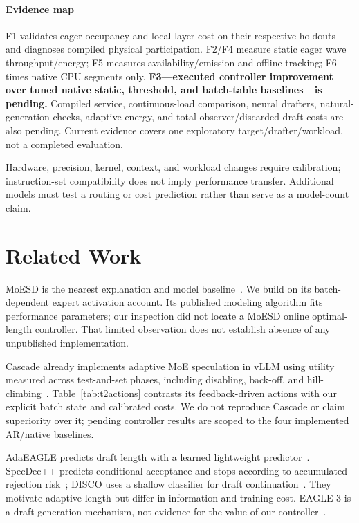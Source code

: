 \documentclass[conference,letterpaper]{IEEEtran}
\begin{document}
\paragraph{Evidence map} F1 validates eager occupancy and local layer cost on their respective holdouts and diagnoses compiled physical participation. F2/F4 measure static eager wave throughput/energy; F5 measures availability/emission and offline tracking; F6 times native CPU segments only. \textbf{F3---executed controller improvement over tuned native static, threshold, and batch-table baselines---is pending.} Compiled service, continuous-load comparison, neural drafters, natural-generation checks, adaptive energy, and total observer/discarded-draft costs are also pending. Current evidence covers one exploratory target/drafter/workload, not a completed evaluation.

Hardware, precision, kernel, context, and workload changes require calibration; instruction-set compatibility does not imply performance transfer. Additional models must test a routing or cost prediction rather than serve as a model-count claim.

\section{Related Work}

MoESD is the nearest explanation and model baseline~\cite{moesd}. We build on its batch-dependent expert activation account. Its published modeling algorithm fits performance parameters; our inspection did not locate a MoESD online optimal-length controller. That limited observation does not establish absence of any unpublished implementation.

Cascade already implements adaptive MoE speculation in vLLM using utility measured across test-and-set phases, including disabling, back-off, and hill-climbing~\cite{cascade}. Table~\ref{tab:t2actions} contrasts its feedback-driven actions with our explicit batch state and calibrated costs. We do not reproduce Cascade or claim superiority over it; pending controller results are scoped to the four implemented AR/native baselines.

AdaEAGLE predicts draft length with a learned lightweight predictor~\cite{adaeagle}. SpecDec++ predicts conditional acceptance and stops according to accumulated rejection risk~\cite{specdecpp}; DISCO uses a shallow classifier for draft continuation~\cite{disco}. They motivate adaptive length but differ in information and training cost. EAGLE-3 is a draft-generation mechanism, not evidence for the value of our controller~\cite{eagle3}.
\end{document}
